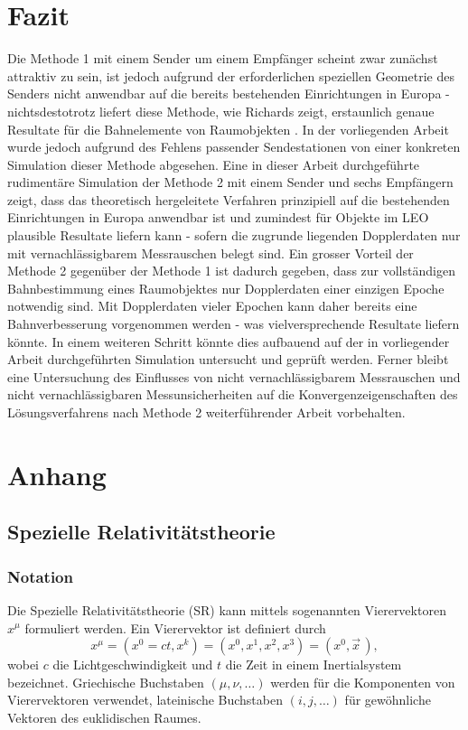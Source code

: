 \documentclass[a4paper,12pt]{article}
\numberwithin{equation}{section}
\begin{document}
\newpage
\section{Fazit}
Die Methode 1 mit einem Sender um einem Empfänger scheint zwar zunächst attraktiv zu sein, ist jedoch aufgrund der erforderlichen speziellen Geometrie des Senders nicht anwendbar auf die bereits bestehenden Einrichtungen in Europa - nichtsdestotrotz liefert diese Methode, wie Richards zeigt, erstaunlich genaue Resultate für die Bahnelemente von Raumobjekten \cite[S.1732]{Richards.1961}. In der vorliegenden Arbeit wurde jedoch aufgrund des Fehlens passender Sendestationen von einer konkreten Simulation dieser Methode abgesehen. Eine in dieser Arbeit durchgeführte rudimentäre Simulation der Methode 2 mit einem Sender und sechs Empfängern zeigt, dass das theoretisch hergeleitete Verfahren prinzipiell auf die bestehenden Einrichtungen in Europa anwendbar ist und zumindest für Objekte im LEO plausible Resultate liefern kann - sofern die zugrunde liegenden Dopplerdaten nur mit vernachlässigbarem Messrauschen belegt sind. Ein grosser Vorteil der Methode 2 gegenüber der Methode 1 ist dadurch gegeben, dass zur vollständigen Bahnbestimmung eines Raumobjektes nur Dopplerdaten einer einzigen Epoche notwendig sind. Mit Dopplerdaten vieler Epochen kann daher bereits eine Bahnverbesserung vorgenommen werden - was vielversprechende Resultate liefern könnte. In einem weiteren Schritt könnte dies aufbauend auf der in vorliegender Arbeit durchgeführten Simulation untersucht und geprüft werden. Ferner bleibt eine Untersuchung des Einflusses von nicht vernachlässigbarem Messrauschen und nicht vernachlässigbaren Messunsicherheiten auf die Konvergenzeigenschaften des Lösungsverfahrens nach Methode 2 weiterführender Arbeit vorbehalten.

\newpage
\section{Anhang}
\subsection{Spezielle Relativitätstheorie}
\subsubsection{Notation}
Die Spezielle Relativitätstheorie (SR) kann mittels sogenannten Vierervektoren $x^\mu$ formuliert werden. Ein Vierervektor ist definiert durch \begin{equation}\label{defvierervektor}
x^\mu = (x^0 = ct,x^k) = (x^0,x^1,x^2,x^3) = (x^0, \vec{x}\,),
\end{equation} wobei $c$ die Lichtgeschwindigkeit und $t$ die Zeit in einem Inertialsystem bezeichnet. Griechische Buchstaben $(\mu, \nu, \dots)$ werden für die Komponenten von Vierervektoren verwendet, lateinische Buchstaben $(i,j,\dots)$ für gewöhnliche Vektoren des euklidischen Raumes.
\end{document}
